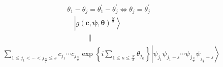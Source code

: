 \documentclass[aps,preprint]{revtex4}%
\begin{document}
\[
\theta_{1}-\theta_{j}=\theta_{1}^{\prime}-\theta_{j}^{\prime}\Leftrightarrow
\theta_{j}=\theta_{j}^{\prime}%
\]%
\begin{align*}
&  \qquad\qquad\qquad\qquad\qquad\left\vert g\left(  \mathbf{c,\psi,\theta
}\right)  ^{\frac{N}{2}}\right\rangle \\
&  \qquad\qquad\qquad\qquad\qquad\qquad\left.  \parallel\right.  \\
&  \sum_{1\leq j_{1}<\cdots<j_{\frac{N}{2}}\leq s}c_{j_{1}}\cdots
c_{j_{\frac{N}{2}}}\exp\left\{  i\sum\limits_{1\leq\kappa\leq\frac{N}{2}%
}\theta_{j_{\kappa}}\right\}  \left\vert \psi_{j_{1}}\psi_{j_{1}+s}\cdots
\psi_{j_{\frac{N}{2}}}\psi_{_{j_{\frac{N}{2}}}+s}\right\rangle
\end{align*}
\end{document}
